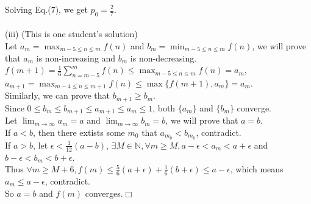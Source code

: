 \documentclass{homework}
\begin{document}
Solving Eq.(7), we get $p_{0}=\frac{2}{7}$.\\
\\
(iii) (This is one student's solution) \\
Let $a_{m}=\max _{m-5 \leqslant n \leqslant m} f(n)$ and $b_{m}=\min _{m-5 \leqslant n \leqslant m} f(n)$,
we will prove that $a_{m}$ is non-increasing and $b_{m}$ is non-decreasing.\\
$f(m+1)=\frac{1}{6} \sum_{n=m-5}^{m} f(n) \leqslant \max _{m-5 \leqslant n \leqslant m} f(n)=a_{m}$,\\
$a_{m+1}=\max _{m-4 \leqslant n \leqslant m+1} f(n) \leqslant \max \{f(m+1), a_{m}\}=a_{m}$.\\
Similarly, we can prove that $b_{m+1} \ge b_{m}$.\\
Since $0 \leqslant b_{m} \leqslant b_{m+1} \leqslant a_{m+1} \leqslant a_{m} \leqslant 1$, both $\{a_{m}\}$ and $\{b_{m}\}$ converge.\\

Let $\lim_{m \to \infty}a_{m}=a$ and $\lim_{m \to \infty}b_{m}=b$, we will prove that $a=b$.\\
If $a < b$, then there extists some $m_{0}$ that $a_{m_{0}} < b_{m_{0}}$, contradict.\\
If $a > b$, let $\epsilon < \frac{1}{12}(a-b)$, $\exists M\in\mathbb{N}, \forall m \geq M, a-\epsilon<a_{m}<a+\epsilon$
and $b-\epsilon<b_{m}<b+\epsilon$.\\
Thus $\forall m \geq M+6, f(m) \leq \frac{5}{6}(a+\epsilon)+\frac{1}{6}(b+\epsilon)\leq a-\epsilon$, 
which means $a_{m} \leq a-\epsilon$, contradict.\\
So $a=b$ and $f(m)$ converges.$\Box$ 
\end{document}
